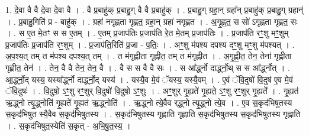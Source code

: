 \documentclass[17pt]{extarticle}
\begin{document}
1. दे॒वा वै वै दे॒वा दे॒वा वै । . वै प्र॒बाहु॑क् प्र॒बाहु॒ग् वै वै प्र॒बाहु॑क् । . प्र॒बाहु॒ग् ग्रहा॒न् ग्रहा᳚न् प्र॒बाहु॑क् प्र॒बाहु॒ग् ग्रहान्॑ । . प्र॒बाहु॒गिति॑ प्र - बाहु॑क् । . ग्रहा॑ नगृह्णता गृह्णत॒ ग्रहा॒न् ग्रहा॑ नगृह्णत । . अ॒गृ॒ह्ण॒त॒ स सो॑ ऽगृह्णता गृह्णत॒ सः । . स ए॒त मे॒तꣳ स स ए॒तम् । . ए॒तम् प्र॒जाप॑तिः प्र॒जाप॑ति रे॒त मे॒तम् प्र॒जाप॑तिः । . प्र॒जाप॑ति रꣳ॒॒शु मꣳ॒॒शुम् प्र॒जाप॑तिः प्र॒जाप॑ति रꣳ॒॒शुम् । . प्र॒जाप॑ति॒रिति॑ प्र॒जा - प॒तिः॒ । . अꣳ॒॒शु म॑पश्य दपश्य दꣳ॒॒शु मꣳ॒॒शु म॑पश्यत् । . अ॒प॒श्य॒त् तम् त म॑पश्य दपश्य॒त् तम् । . त म॑गृह्णीता गृह्णीत॒ तम् त म॑गृह्णीत । . अ॒गृ॒ह्णी॒त॒ तेन॒ तेना॑ गृह्णीता गृह्णीत॒ तेन॑ । . तेन॒ वै वै तेन॒ तेन॒ वै । . वै स स वै वै सः । . स आ᳚र्द्ध्नो दार्द्ध्नो॒थ् स स आ᳚र्द्ध्नोत् । . आ॒र्द्ध्नो॒द् यस्य॒ यस्या᳚र्द्ध्नो दार्द्ध्नो॒द् यस्य॑ । . यस्यै॒व मे॒वं ॅयस्य॒ यस्यै॒वम् । . ए॒वं ॅवि॒दुषो॑ वि॒दुष॑ ए॒व मे॒वं ॅवि॒दुषः॑ । . वि॒दुषो॒ ऽꣳ॒शु रꣳ॒॒शुर् वि॒दुषो॑ वि॒दुषो॒ ऽꣳ॒शुः । . अꣳ॒॒शुर् गृ॒ह्यते॑ गृ॒ह्यते॒ ऽꣳ॒शु रꣳ॒॒शुर् गृ॒ह्यते᳚ । . गृ॒ह्यत॑ ऋ॒द्ध्नो त्यृ॒द्ध्नोति॑ गृ॒ह्यते॑ गृ॒ह्यत॑ ऋ॒द्ध्नोति॑ । . ऋ॒द्ध्नो त्ये॒वैव र्‌द्ध्नो त्यृ॒द्ध्नो त्ये॒व । . ए॒व स॒कृद॑भिषुतस्य स॒कृद॑भिषुत स्यै॒वैव स॒कृद॑भिषुतस्य । . स॒कृद॑भिषुतस्य गृह्णाति गृह्णाति स॒कृद॑भिषुतस्य स॒कृद॑भिषुतस्य गृह्णाति । . स॒कृद॑भिषुत॒स्येति॑ स॒कृत् - अ॒भि॒षु॒त॒स्य॒ । \newline
\end{document}
